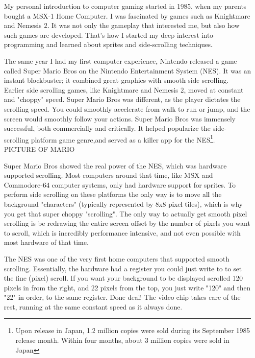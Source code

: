 \documentclass[book.tex]{subfiles}
\begin{document}
My personal introduction to computer gaming started in 1985, when my parents bought a MSX-1 Home Computer. I was fascinated by games such as Knightmare and Nemesis 2. It was not only the gameplay that interested me, but also how such games are developed. That's how I started my deep interest into programming and learned about sprites and side-scrolling techniques.\\
\par
The same year I had my first computer experience, Nintendo released a game called Super Mario Bros on the Nintendo Entertainment System (NES). It was an instant blockbuster; it combined great graphics with smooth side scrolling. Earlier side scrolling games, like Knightmare and Nemesis 2, moved at constant and "choppy" speed. Super Mario Bros was different, as the player dictates the scrolling speed. You could smoothly accelerate from walk to run or jump, and the screen would smoothly follow your actions. Super Mario Bros was immensely successful, both commercially and critically. It helped popularize the side-scrolling platform game genre,and served as a killer app for the NES\footnote{Upon release in Japan, 1.2 million copies were sold during its September 1985 release month. Within four months, about 3 million copies were sold in Japan}.\\
PICTURE OF MARIO\\
\par
Super Mario Bros showed the real power of the NES, which was hardware supported scrolling. Most computers around that time, like MSX and Commodore-64 computer systems, only had hardware support for sprites. To perform side scrolling on these platforms the only way is to move all the background "characters" (typically represented by 8x8 pixel tiles), which is why you get that super choppy "scrolling". The only way to actually get smooth pixel scrolling is be redrawing the entire screen offset by the number of pixels you want to scroll, which is incredibly performance intensive, and not even possible with most hardware of that time. \\
\par
The NES was one of the very first home computers that supported smooth scrolling. Essentially, the hardware had a register you could just write to to set the fine (pixel) scroll. If you want your background to be displayed scrolled 120 pixels in from the right, and 22 pixels from the top, you just write "120" and then "22" in order, to the same register. Done deal! The video chip takes care of the rest, running at the same constant speed as it always done.\\
\end{document}
